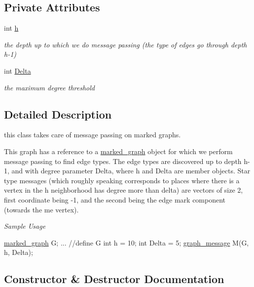\subsection*{Private Attributes}
\begin{DoxyCompactItemize}
\item 
int \hyperlink{classgraph__message_a934d63ed7275c211e13c6fb68824ed46}{h}
\begin{DoxyCompactList}\small\item\em the depth up to which we do message passing (the type of edges go through depth h-\/1) \end{DoxyCompactList}\item 
int \hyperlink{classgraph__message_a45dfd061b7bc73572e5132fbf66efd55}{Delta}
\begin{DoxyCompactList}\small\item\em the maximum degree threshold \end{DoxyCompactList}\end{DoxyCompactItemize}


\subsection{Detailed Description}
this class takes care of message passing on marked graphs. 

This graph has a reference to a \hyperlink{classmarked__graph}{marked\+\_\+graph} object for which we perform message passing to find edge types. The edge types are discovered up to depth h-\/1, and with degree parameter Delta, where h and Delta are member objects. Star type messages (which roughly speaking corresponds to places where there is a vertex in the h neighborhood has degree more than delta) are vectors of size 2, first coordinate being -\/1, and the second being the edge mark component (towards the \textquotesingle{}me\textquotesingle{} vertex).

{\itshape Sample Usage}


\begin{DoxyCode}
\hyperlink{classmarked__graph}{marked\_graph} G;
... \textcolor{comment}{//define G}
\textcolor{keywordtype}{int} h = 10;
\textcolor{keywordtype}{int} Delta = 5; 
\hyperlink{classgraph__message}{graph\_message} M(G, h, Delta);
\end{DoxyCode}
 

\subsection{Constructor \& Destructor Documentation}
\mbox{\label{classgraph__message_a792e738b94a19f914e5495c416defe4d}} 
